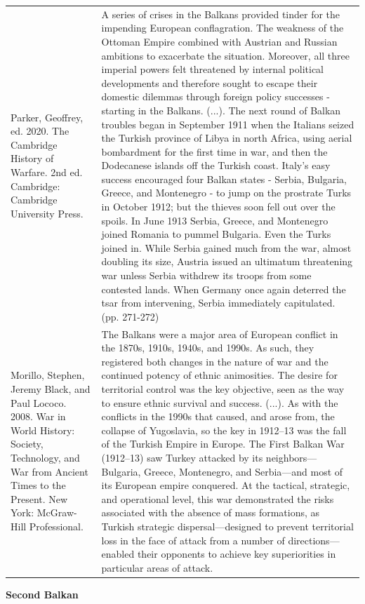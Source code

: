 {\begin{longtable}{p{}p{}}
\\
Parker, Geoffrey, ed. 2020. The Cambridge History of Warfare. 2nd ed. Cambridge: Cambridge University Press. & A series of crises in the Balkans provided tinder for the impending European conflagration. The weakness of the Ottoman Empire combined with Austrian and Russian ambitions to exacerbate the situation. Moreover, all three imperial powers felt threatened by internal political developments and therefore sought to escape their domestic dilemmas through foreign policy successes - starting in the Balkans. (...). 
The next round of Balkan troubles began in September 1911 when the Italians seized the Turkish province of Libya in north Africa, using aerial bombardment for the first time in war, and then the Dodecanese islands off the Turkish coast. Italy's easy success encouraged four Balkan states - Serbia, Bulgaria, Greece, and Montenegro - to jump on the prostrate Turks in October 1912; but the thieves soon fell out over the spoils. In June 1913 Serbia, Greece, and Montenegro joined Romania to pummel Bulgaria. Even the Turks joined in. While Serbia gained much from the war, almost doubling its size, Austria issued an ultimatum threatening war unless Serbia withdrew its troops from some contested lands. When Germany once again deterred the tsar from intervening, Serbia immediately capitulated. (pp. 271-272)
\\
Morillo, Stephen, Jeremy Black, and Paul Lococo. 2008. War in World History: Society, Technology, and War from Ancient Times to the Present. New York: McGraw-Hill Professional. & The Balkans were a major area of European conflict in the 1870s, 1910s, 1940s, and 1990s. As
such, they registered both changes in the nature of war and the continued potency of ethnic animosities. The desire for territorial control was the key objective, seen as the way to ensure ethnic survival and success. (...). As with the conflicts in the 1990s that caused, and arose from, the collapse of Yugoslavia, so the key in 1912–13 was the fall of the Turkish Empire in Europe. The First Balkan War (1912–13) saw Turkey attacked by its neighbors—Bulgaria, Greece, Montenegro, and Serbia—and most of its European empire conquered. At the tactical, strategic, and operational level, this war demonstrated the risks associated with the absence of mass formations, as Turkish strategic dispersal—designed to prevent territorial loss in the face of attack from a number of directions—enabled their opponents to achieve key superiorities in particular areas of attack.
\\
\end{longtable}}
\clearpage
         \textbf{Second Balkan} 

